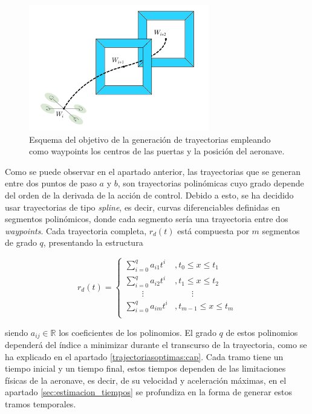 \begin{figure}[htb!]
	\centering
	\includegraphics[width=0.7\textwidth]{imagenes/TrajCont}
	\caption{Esquema del objetivo de la generación de trayectorias empleando como waypoints los centros de las puertas y la posición del aeronave.}
	\label{TrajCont}
\end{figure}

Como se puede observar en el apartado anterior, las trayectorias que se generan entre dos puntos de paso $a$ y $b$, son trayectorias polinómicas cuyo grado depende del orden de la derivada de la acción de control. Debido a esto, se ha decidido usar trayectorias de tipo \textit{spline}, es decir, curvas diferenciables definidas en segmentos polinómicos, donde cada segmento sería una trayectoria entre dos \textit{waypoints}. Cada trayectoria completa, $r_d(t)$ está compuesta por $m$ segmentos de grado $q$, presentando la estructura

\begin{equation}
	r_d(t) = \left\{ 
	\begin{array}{ll}
		\sum_{i=0}^{q}a_{i1}t^{i} &,t_0\leq x \leq t_1 \\
		\sum_{i=0}^{q}a_{i2}t^{i} &,t_1\leq x \leq t_2 \\
		\qquad\vdots &\qquad\vdots \\
		\sum_{i=0}^{q}a_{im}t^{i} &,t_{m-1}\leq x \leq t_m \\
	\end{array}
	\right.
\end{equation}

siendo $a_{ij}\in \mathbb{R}$ los coeficientes de los polinomios. El grado $q$ de estos polinomios dependerá del índice a minimizar durante el transcurso de la trayectoria, como se ha explicado en el apartado \ref{trajectoriasoptimas:cap}. Cada tramo tiene un tiempo inicial y un tiempo final, estos tiempos dependen de las limitaciones físicas de la aeronave, es decir, de su velocidad y aceleración máximas, en el apartado \ref{sec:estimacion_tiempos} se profundiza en la forma de generar estos tramos temporales.

